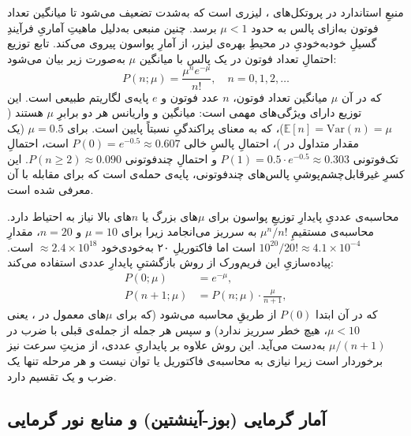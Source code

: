 منبعِ استاندارد در پروتکل‌های ، لیزری است که به‌شدت تضعیف می‌شود تا میانگین تعداد فوتون به‌ازای پالس به حدود $\mu < 1$ برسد. چنین منبعی به‌دلیل ماهیتِ آماریِ فرآیندِ گسیلِ خودبه‌خودیِ  در محیطِ بهره‌ی لیزر، از آمارِ پواسون پیروی می‌کند. تابع توزیع احتمالِ تعداد فوتون در یک پالس با میانگین $\mu$ به‌صورت زیر بیان می‌شود:
\begin{equation}
	P(n;\mu) = \frac{\mu^n e^{-\mu}}{n!}, \quad n = 0, 1, 2, \dots
	\label{eq:poisson-pmf}
\end{equation}
که در آن $\mu$ میانگین تعداد فوتون، $n$ عدد فوتون و $e$ پایه‌ی لگاریتم طبیعی است. این توزیع دارای ویژگی‌های مهمی است: میانگین و واریانس هر دو برابرِ $\mu$ هستند ($\mathbb{E}[n] = \text{Var}(n) = \mu$)، که به معنای پراکندگیِ نسبتاً پایین است. برای $\mu = 0.5$ (یک مقدار متداول در )، احتمالِ پالسِ خالی $P(0) = e^{-0.5} \approx 0.607$ است، احتمالِ تک‌فوتونی $P(1) = 0.5 \cdot e^{-0.5} \approx 0.303$ و احتمالِ چندفوتونی $P(n \geq 2) \approx 0.090$. این کسرِ غیرقابل‌چشم‌پوشیِ پالس‌های چندفوتونی، پایه‌ی حمله‌ی  است که  برای مقابله با آن معرفی شده است.

محاسبه‌ی عددیِ پایدارِ توزیعِ پواسون برای $\mu$‌های بزرگ یا $n$‌های بالا نیاز به احتیاط دارد. محاسبه‌ی مستقیمِ $\mu^n / n!$ به سرریز  می‌انجامد زیرا برای $\mu = 10$ و $n = 20$، مقدارِ $10^{20}/20! \approx 4.1 \times 10^{-4}$ است اما فاکتوریلِ ۲۰ به‌خودی‌خود $\approx 2.4 \times 10^{18}$ است. پیاده‌سازیِ این فریم‌ورک از روش بازگشتیِ پایدارِ عددی استفاده می‌کند:
\begin{align}
	P(0;\mu) &= e^{-\mu}, \label{eq:poisson-recurrence-init} \\
	P(n+1;\mu) &= P(n;\mu) \cdot \frac{\mu}{n+1}, \label{eq:poisson-recurrence}
\end{align}
که در آن ابتدا $P(0)$ از طریقِ  محاسبه می‌شود (که برای $\mu$‌های معمول در ، یعنی $\mu < 10$، هیچ خطر سرریز ندارد) و سپس هر جمله از جمله‌ی قبلی با ضرب در $\mu/(n+1)$ به‌دست می‌آید. این روش علاوه بر پایداریِ عددی، از مزیتِ سرعت نیز برخوردار است زیرا نیازی به محاسبه‌ی فاکتوریل یا توان نیست و هر مرحله تنها یک ضرب و یک تقسیم دارد.

\subsection{آمار گرمایی (بوز-آینشتین) و منابع نور گرمایی}

